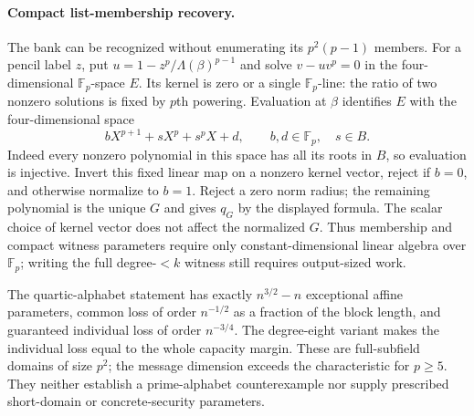 \paragraph{Compact list-membership recovery.}
The bank can be recognized without enumerating its $p^2(p-1)$ members.
For a pencil label $z$, put
$u=1-z^p/\Lambda(\beta)^{p-1}$ and solve
$v-u v^p=0$ in the four-dimensional $\mathbb F_p$-space $E$.
Its kernel is zero or a single $\mathbb F_p$-line: the ratio of two
nonzero solutions is fixed by $p$th powering.
Evaluation at $\beta$ identifies $E$ with the four-dimensional space
\[
 bX^{p+1}+sX^p+s^pX+d,
 \qquad b,d\in\mathbb F_p,\quad s\in B.
\]
Indeed every nonzero polynomial in this space has all its roots in
$B$, so evaluation is injective. Invert this fixed linear map on a
nonzero kernel vector, reject if $b=0$, and otherwise normalize to
$b=1$. Reject a zero norm radius; the remaining polynomial is the
unique $G$ and gives $q_G$ by the displayed formula. The scalar
choice of kernel vector does not affect the normalized $G$.
Thus membership and compact witness parameters require only
constant-dimensional linear algebra over $\mathbb F_p$; writing the
full degree-$<k$ witness still requires output-sized work.

The quartic-alphabet statement has exactly
$n^{3/2}-n$ exceptional affine parameters, common loss of order $n^{-1/2}$ as a fraction of the
block length, and guaranteed individual loss of order $n^{-3/4}$.
The degree-eight variant makes the individual loss equal to the
whole capacity margin. These are full-subfield domains of size $p^2$;
the message dimension exceeds the characteristic for $p\ge5$.
They neither establish a prime-alphabet counterexample nor supply
prescribed short-domain or concrete-security parameters.
